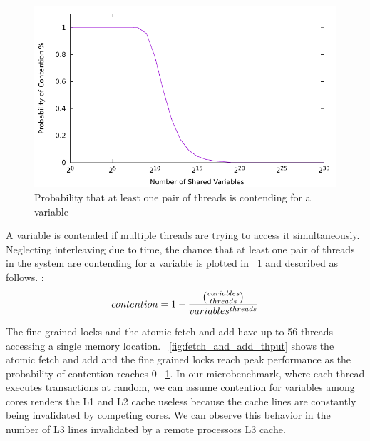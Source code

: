 \documentclass{uicthesi}
\begin{document}
\begin{figure}[ht!]
\centering
\includegraphics[width=0.9\columnwidth]{FIG/contention.pdf}
\caption{Probability that at least one pair of threads is contending for a variable}
\label{fig:contention}
\end{figure}

A variable is contended if multiple threads are trying to access it simultaneously. Neglecting interleaving due to time, the chance that at least one pair of threads in the system are contending for a variable is plotted in ~\ref{fig:contention} and described as follows. : 
\begin{displaymath}
contention = 1 - {{ variables \choose threads }  \over  variables^{threads}}
\end{displaymath}


The fine grained locks and the atomic fetch and add have up to 56 threads accessing a single memory location. ~\ref{fig:fetch_and_add_thput} shows the atomic fetch and add and the fine grained locks reach peak performance as the probability of contention reaches 0 ~\ref{fig:contention}. In our microbenchmark, where each thread executes transactions at random, we can assume contention for variables among cores renders the L1 and L2 cache useless because the cache lines are constantly being invalidated by competing cores. We can observe this behavior in the number of L3 lines invalidated by a remote processors L3 cache. 
\end{document}
